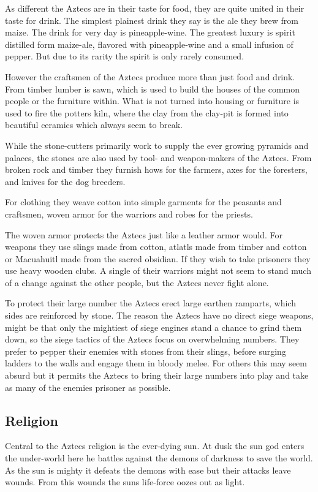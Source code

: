 \documentclass[a4paper]{book}
\begin{document}
	As different the \gls{Aztecs} are in their taste for food,
	they are quite united in their taste for drink.
	The simplest plainest drink they say is the ale they brew from maize.
	The drink for very day is pineapple-wine.
	The greatest luxury is spirit distilled form maize-ale, flavored with pineapple-wine
	and a small infusion of pepper.
	But due to its rarity the spirit is only rarely consumed.

	However the craftsmen of the \gls{Aztecs} produce more than just food and drink.
	From timber lumber is sawn, which is used to build the houses of the common people
	or the furniture within.
	What is not turned into housing or furniture is used to fire the potters kiln,
	where the clay from the clay-pit is formed into beautiful ceramics which always seem to break.

	While the stone-cutters primarily work to supply the ever growing pyramids and palaces,
	the stones are also used by tool- and weapon-makers of the \gls{Aztecs}.
	From broken rock and timber they furnish hows for the farmers, axes for the foresters,
	and knives for the dog breeders.

	For clothing they weave cotton into simple garments for the peasants and craftsmen,
	woven armor for the warriors and robes for the priests.

	The woven armor protects the \gls{Aztecs} just like a leather armor would.
	For weapons they use slings made from cotton, atlatls made from timber and cotton
	or Macuahuitl made from the sacred obsidian.
	If they wish to take prisoners they use heavy wooden clubs.
	A single of their warriors might not seem to stand much of a change against the other people,
	but the \gls{Aztecs} never fight alone.

	To protect their large number the \gls{Aztecs} erect large earthen ramparts,
	which sides are reinforced by stone.
	The reason the \gls{Aztecs} have no direct siege weapons,
	might be that only the mightiest of siege engines stand a chance to grind them down,
	so the siege tactics of the \gls{Aztecs} focus on overwhelming numbers.
	They prefer to pepper their enemies with stones from their slings,
	before surging ladders to the walls and engage them in bloody melee.
	For others this may seem absurd but it permits the \gls{Aztecs} to bring their large
	numbers into play and take as many of the enemies prisoner as possible.

	\subsection{Religion}
		Central to the \gls{Aztecs} religion is the ever-dying sun.
		At dusk the sun god enters the under-world here he battles against
		the demons of darkness to save the world.
		As the sun is mighty it defeats the demons with ease but their attacks leave wounds.
		From this wounds the suns life-force oozes out as light.
\end{document}
